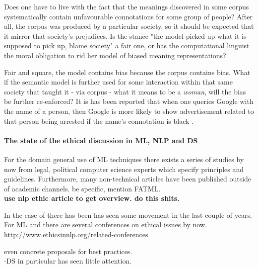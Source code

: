 \documentclass{article}
\begin{document}
Does one have to live with the fact that the meanings discovered in some corpus systematically contain unfavourable connotations for some group of people? After all, the corpus was produced by a particular society, so it should be expected that it mirror that society's prejudices. Is the stance "the model picked up what it is supposed to pick up, blame society" a fair one, or has the computational linguist the moral obligation to rid her model of biased meaning representations?

Fair and square, the model contains bias because the corpus contains bias. What if the semantic model is further used for some interaction within that same society that taught it - via corpus - what it means to be a \emph{woman}, will the bias be further re-enforced? It is has been reported that when one queries Google with the name of a person, then Google is more likely to show advertisement related to that person being arrested if the name's connotation is black \cite{sweeney2013discrimination}.

\paragraph{The state of the ethical discussion in ML, NLP and DS}
For the domain general use of ML techniques there exists a series of studies by now from legal, political computer science experts which specify principles and guidelines. Furthermore, many non-technical articles have been published outside of academic channels. 
be specific, mention FATML. \\
\textbf{use nlp ethic article to get overview. do this shits.}

In the case of  there has been  has seen some movement in the last couple of years.
For ML and  there are several  conferences on ethical issues by now.
http://www.ethicsinnlp.org/related-conferences

 even concrete proposals for best practices.\\
-DS in particular has seen little attention.
\end{document}
